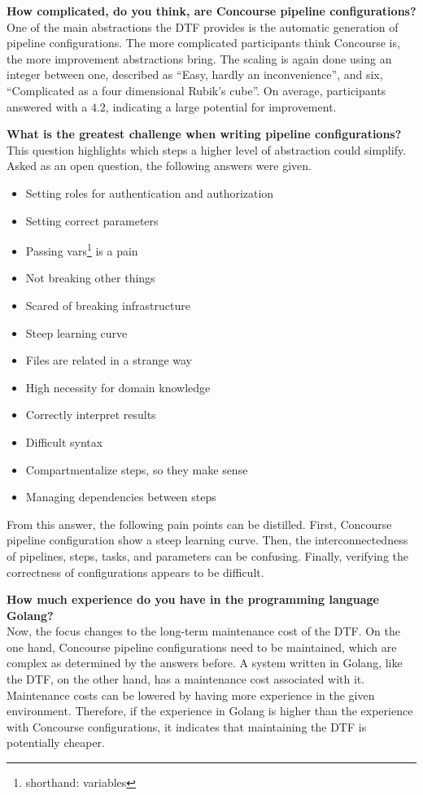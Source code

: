 \textbf{How complicated, do you think, are Concourse pipeline configurations?}\\
One of the main abstractions the DTF provides is the automatic generation of pipeline configurations.
The more complicated participants think Concourse is, the more improvement abstractions bring.
The scaling is again done using an integer between one, described as ``Easy, hardly an inconvenience'', and six, ``Complicated as a four dimensional Rubik's cube''.
On average, participants answered with a $4.2$, indicating a large potential for improvement.

\textbf{What is the greatest challenge when writing pipeline configurations?}\\
This question highlights which steps a higher level of abstraction could simplify.
Asked as an open question, the following answers were given.

\begin{itemize}
    \item Setting roles for authentication and authorization
    \item Setting correct parameters
    \item Passing vars\footnote{shorthand: variables} is a pain
    \item Not breaking other things
    \item Scared of breaking infrastructure
    \item Steep learning curve
    \item Files are related in a strange way
    \item High necessity for domain knowledge
    \item Correctly interpret results
    \item Difficult syntax
    \item Compartmentalize steps, so they make sense
    \item Managing dependencies between steps
\end{itemize}

From this answer, the following pain points can be distilled.
First, Concourse pipeline configuration show a steep learning curve.
Then, the interconnectedness of pipelines, steps, tasks, and parameters can be confusing.
Finally, verifying the correctness of configurations appears to be difficult.

\textbf{How much experience do you have in the programming language Golang?}\\
Now, the focus changes to the long-term maintenance cost of the DTF.
On the one hand, Concourse pipeline configurations need to be maintained, which are complex as determined by the answers before.
A system written in Golang, like the DTF, on the other hand, has a maintenance cost associated with it.
Maintenance costs can be lowered by having more experience in the given environment.
Therefore, if the experience in Golang is higher than the experience with Concourse configurations, it indicates that maintaining the DTF is potentially cheaper.


